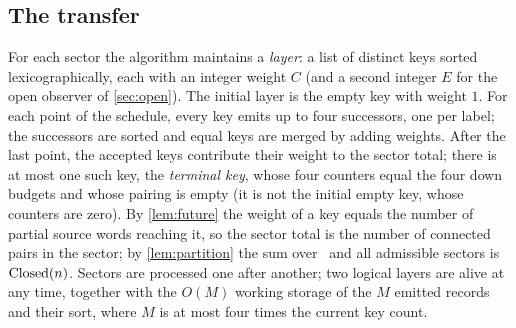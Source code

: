 \subsection{The transfer}

For each sector the algorithm maintains a \emph{layer}: a list of distinct
keys sorted lexicographically, each with an integer weight $C$ (and a second
integer $E$ for the open observer of \cref{sec:open}). The initial layer is the
empty key with weight $1$. For each point of the schedule, every key emits up
to four successors, one per label; the successors are sorted and equal keys
are merged by adding weights. After the last point, the accepted keys contribute their weight to the sector
total; there is at most one such key, the \emph{terminal key}, whose four
counters equal the four down budgets and whose pairing is empty (it is not the
initial empty key, whose counters are zero). By
\cref{lem:future} the weight of a key equals the number of partial source
words reaching it, so the sector total is the number of connected pairs in the
sector; by \cref{lem:partition} the sum over \LOW\ and all admissible sectors is
$\operatorname{Closed}(n)$. Sectors are processed one after another; two logical layers are alive at
any time, together with the $O(M)$ working storage of the $M$ emitted records
and their sort, where $M$ is at most four times the current key count.
